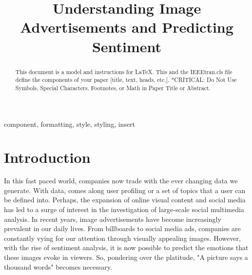 \documentclass[conference]{IEEEtran}
\begin{document}
\title{Understanding Image Advertisements and Predicting Sentiment\\}

\author{
\and
{}
}

\maketitle

\begin{abstract}
This document is a model and instructions for \LaTeX.
This and the IEEEtran.cls file define the components of your paper [title, text, heads, etc.]. *CRITICAL: Do Not Use Symbols, Special Characters, Footnotes, 
or Math in Paper Title or Abstract.
\end{abstract}

\begin{IEEEkeywords}
component, formatting, style, styling, insert
\end{IEEEkeywords}

\section{Introduction}
In this fast paced world, companies now trade with the ever changing data we generate. With data, comes along user profiling or a set of topics that a user can be defined into. Perhaps, the  expansion of online visual content and social media has led to a surge of interest in the investigation of large-scale social multimedia analysis. In recent years, image advertisements have become increasingly prevalent in our daily lives. From billboards to social media ads, companies are constantly vying for our attention through visually appealing images. However, with the rise of sentiment analysis, it is now possible to predict the emotions that these images evoke in viewers. So, pondering over the platitude, "A picture says a thousand words" becomes necessary.
\end{document}
